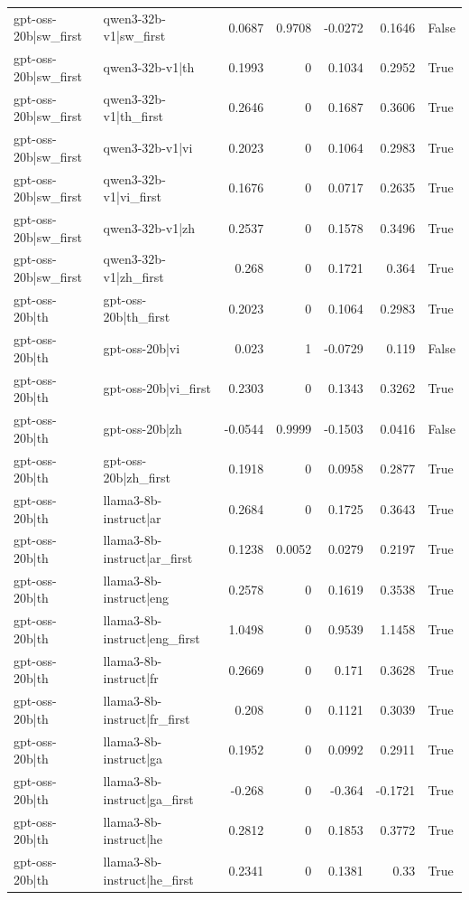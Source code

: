 \begin{table}
\begin{tabular}{l l r r r r l}
gpt-oss-20b|sw_first & qwen3-32b-v1|sw_first & 0.0687 & 0.9708 & -0.0272 & 0.1646 & False \\
gpt-oss-20b|sw_first & qwen3-32b-v1|th & 0.1993 & 0 & 0.1034 & 0.2952 & True \\
gpt-oss-20b|sw_first & qwen3-32b-v1|th_first & 0.2646 & 0 & 0.1687 & 0.3606 & True \\
gpt-oss-20b|sw_first & qwen3-32b-v1|vi & 0.2023 & 0 & 0.1064 & 0.2983 & True \\
gpt-oss-20b|sw_first & qwen3-32b-v1|vi_first & 0.1676 & 0 & 0.0717 & 0.2635 & True \\
gpt-oss-20b|sw_first & qwen3-32b-v1|zh & 0.2537 & 0 & 0.1578 & 0.3496 & True \\
gpt-oss-20b|sw_first & qwen3-32b-v1|zh_first & 0.268 & 0 & 0.1721 & 0.364 & True \\
gpt-oss-20b|th & gpt-oss-20b|th_first & 0.2023 & 0 & 0.1064 & 0.2983 & True \\
gpt-oss-20b|th & gpt-oss-20b|vi & 0.023 & 1 & -0.0729 & 0.119 & False \\
gpt-oss-20b|th & gpt-oss-20b|vi_first & 0.2303 & 0 & 0.1343 & 0.3262 & True \\
gpt-oss-20b|th & gpt-oss-20b|zh & -0.0544 & 0.9999 & -0.1503 & 0.0416 & False \\
gpt-oss-20b|th & gpt-oss-20b|zh_first & 0.1918 & 0 & 0.0958 & 0.2877 & True \\
gpt-oss-20b|th & llama3-8b-instruct|ar & 0.2684 & 0 & 0.1725 & 0.3643 & True \\
gpt-oss-20b|th & llama3-8b-instruct|ar_first & 0.1238 & 0.0052 & 0.0279 & 0.2197 & True \\
gpt-oss-20b|th & llama3-8b-instruct|eng & 0.2578 & 0 & 0.1619 & 0.3538 & True \\
gpt-oss-20b|th & llama3-8b-instruct|eng_first & 1.0498 & 0 & 0.9539 & 1.1458 & True \\
gpt-oss-20b|th & llama3-8b-instruct|fr & 0.2669 & 0 & 0.171 & 0.3628 & True \\
gpt-oss-20b|th & llama3-8b-instruct|fr_first & 0.208 & 0 & 0.1121 & 0.3039 & True \\
gpt-oss-20b|th & llama3-8b-instruct|ga & 0.1952 & 0 & 0.0992 & 0.2911 & True \\
gpt-oss-20b|th & llama3-8b-instruct|ga_first & -0.268 & 0 & -0.364 & -0.1721 & True \\
gpt-oss-20b|th & llama3-8b-instruct|he & 0.2812 & 0 & 0.1853 & 0.3772 & True \\
gpt-oss-20b|th & llama3-8b-instruct|he_first & 0.2341 & 0 & 0.1381 & 0.33 & True \\

\end{tabular}
\end{table}
